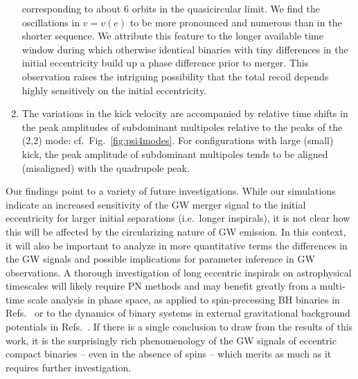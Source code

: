 \documentclass[floats,floatfix,showpacs,amssymb,prd,twocolumn,superscriptaddress,nofootinbib,nolongbibliography,reprint]{revtex4-2}
\begin{document}
\begin{enumerate}[label=(\roman*)]
 corresponding to about 6 orbits in the quasicircular limit.
 We find the oscillations in $v=v(e)$ to be more pronounced
 and numerous than in the shorter sequence. We attribute this
 feature to the longer available time window during which otherwise
 identical binaries with tiny differences in the initial
 eccentricity build up a phase difference prior to merger.
 This observation raises the intriguing possibility that the
 total recoil depends highly sensitively on the initial eccentricity.
 \item The variations in the kick velocity are accompanied by
 relative time shifts in the peak amplitudes of subdominant
 multipoles relative to the peaks of the (2,2) mode:
 cf.~Fig.~\ref{fig:psi4modes}. For configurations with large (small)
 kick, the peak amplitude of subdominant multipoles tends to
 be aligned (misaligned) with the quadrupole peak.
\end{enumerate}
%
Our findings point to a variety of future investigations. While our
simulations indicate an increased sensitivity of the GW merger signal
to the initial eccentricity for larger initial separations
(i.e.~longer inspirals), it is not clear how this will be affected by
the circularizing nature of GW emission. In this context, it will also
be important to analyze in more quantitative terms the differences in
the GW signals and possible implications for parameter inference in GW
observations. A thorough investigation of long eccentric inspirals on
astrophysical timescales will likely require PN methods and may
benefit greatly from a multi-time scale analysis in phase space, as
applied to spin-precessing BH binaries in
Refs.~\cite{Kesden:2014sla,Gerosa:2015tea} or to the dynamics of
binary systems in external gravitational background potentials in
Refs.~\cite{Hamilton:2019a,Hamilton:2019b}. If there is a single
conclusion to draw from the results of this work, it is the
surprisingly rich phenomenology of the GW signals of eccentric compact
binaries -- even in the absence of spins -- which merits as much as it
requires further investigation.
\end{document}

